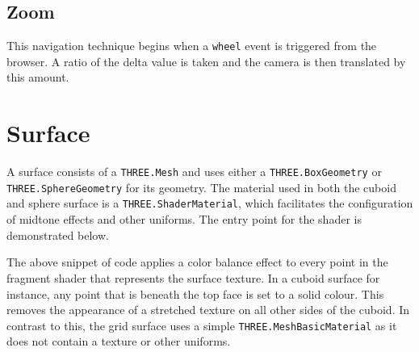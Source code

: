 {{		
	
	}

	\subsection{Zoom} {
	\label{sec:zoom}

		This navigation technique begins when a \texttt{wheel} event is triggered from the browser. A ratio of the delta value is taken and the camera is then translated by this amount.
	
	}

}

\section{Surface} {
\label{sec:surface}

	\begin{sloppypar}
		A surface consists of a \texttt{THREE.Mesh} and uses either a \texttt{THREE.BoxGeometry} or \texttt{THREE.SphereGeometry} for its geometry. The material used in both the cuboid and sphere surface is a \texttt{THREE.ShaderMaterial}, which facilitates the configuration of midtone effects and other uniforms. The entry point for the shader is demonstrated below.
	\end{sloppypar}

	

	The above snippet of code applies a color balance effect to every point in the fragment shader that represents the surface texture. In a cuboid surface for instance, any point that is beneath the top face is set to a solid colour. This removes the appearance of a stretched texture on all other sides of the cuboid. In contrast to this, the grid surface uses a simple \texttt{THREE.MeshBasicMaterial} as it does not contain a texture or other uniforms.

}

